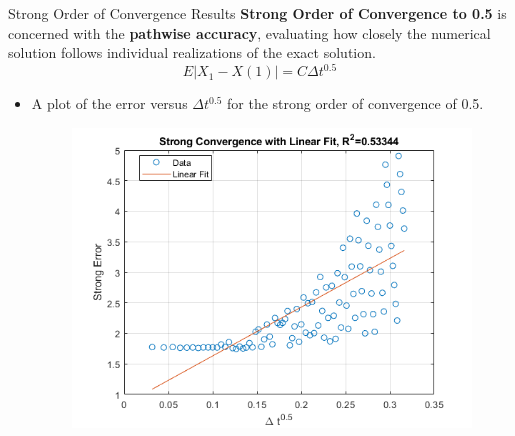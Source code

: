 \documentclass[compress,12pt]{beamer}
\begin{document}
\begin{frame}{Strong Order of Convergence Results}
    \textbf{Strong Order of Convergence to 0.5}  is concerned with the \textbf{pathwise accuracy}, evaluating how closely the numerical solution follows individual realizations of the exact solution.
    \[
    E|X_1-X(1)|=C\Delta t^{0.5} 
    \]
    \begin{itemize}
        \item A plot of the error versus \(\Delta t^{0.5}\) for the  strong order of convergence of 0.5. 
            
             \begin{figure}[H]
            \centering
            \includegraphics[scale=0.4]{fig2.png}
            \label{fig:3a}
             \end{figure}
                
            
    \end{itemize}
    
\end{frame}

\end{document}
